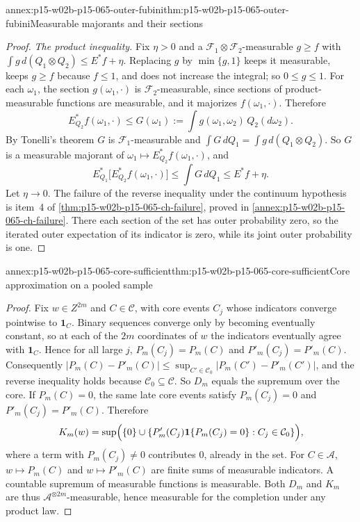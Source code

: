 \begin{annexitem}{annex:p15-w02b-p15-065-outer-fubini}{thm:p15-w02b-p15-065-outer-fubini}{Measurable majorants and their sections}
\begin{proof}
\emph{The product inequality.} Fix \(\eta>0\) and a
\(\mathcal F_1\otimes\mathcal F_2\)-measurable \(g\geq f\) with
\(\int g\,d(Q_1\otimes Q_2)\leq E^{*}f+\eta\). Replacing \(g\) by
\(\min\{g,1\}\) keeps it measurable, keeps \(g\geq f\) because \(f\leq1\),
and does not increase the integral; so \(0\leq g\leq1\). For each
\(\omega_1\), the section \(g(\omega_1,\cdot)\) is
\(\mathcal F_2\)-measurable, since sections of product-measurable functions
are measurable, and it majorizes \(f(\omega_1,\cdot)\). Therefore
\[
 E_{Q_2}^{*}f(\omega_1,\cdot)\leq G(\omega_1):=\int g(\omega_1,\omega_2)\,Q_2(d\omega_2).
\]
By Tonelli's theorem \(G\) is \(\mathcal F_1\)-measurable and
\(\int G\,dQ_1=\int g\,d(Q_1\otimes Q_2)\). So \(G\) is a measurable majorant
of \(\omega_1\mapsto E_{Q_2}^{*}f(\omega_1,\cdot)\), and
\[
 E_{Q_1}^{*}\bigl[E_{Q_2}^{*}f(\omega_1,\cdot)\bigr]\leq\int G\,dQ_1
 \leq E^{*}f+\eta .
\]
Let \(\eta\to0\). The failure of the reverse inequality under the continuum
hypothesis is item~4 of \cref{thm:p15-w02b-p15-065-ch-failure}, proved in
\cref{annex:p15-w02b-p15-065-ch-failure}. There each section of the set has
outer probability zero, so the iterated outer expectation of its indicator
is zero, while its joint outer probability is one.
\end{proof}
\end{annexitem}

\begin{annexitem}{annex:p15-w02b-p15-065-core-sufficient}{thm:p15-w02b-p15-065-core-sufficient}{Core approximation on a pooled sample}
\begin{proof}
Fix \(w\in Z^{2m}\) and \(C\in\mathcal C\), with core events \(C_j\) whose
indicators converge pointwise to \(\mathbf1_C\). Binary sequences converge
only by becoming eventually constant, so at each of the \(2m\) coordinates
of \(w\) the indicators eventually agree with \(\mathbf1_C\). Hence for all
large \(j\), \(P_m(C_j)=P_m(C)\) and \(P'_m(C_j)=P'_m(C)\). Consequently
\(|P_m(C)-P'_m(C)|\leq\sup_{C'\in\mathcal C_0}|P_m(C')-P'_m(C')|\), and the
reverse inequality holds because \(\mathcal C_0\subseteq\mathcal C\). So
\(D_m\) equals the supremum over the core. If \(P_m(C)=0\), the same late
core events satisfy \(P_m(C_j)=0\) and \(P'_m(C_j)=P'_m(C)\). Therefore
\[
 K_m(w)=\sup\Bigl(\{0\}\cup\{P'_m(C_j)\mathbf1\{P_m(C_j)=0\}:C_j\in\mathcal C_0\}\Bigr),
\]
where a term with \(P_m(C_j)\ne0\) contributes \(0\), already in the set.
For \(C\in\mathcal A\), \(w\mapsto P_m(C)\) and \(w\mapsto P'_m(C)\) are
finite sums of measurable indicators. A countable supremum of measurable
functions is measurable. Both \(D_m\) and \(K_m\) are thus
\(\mathcal A^{\otimes2m}\)-measurable, hence measurable for the completion
under any product law.
\end{proof}
\end{annexitem}

